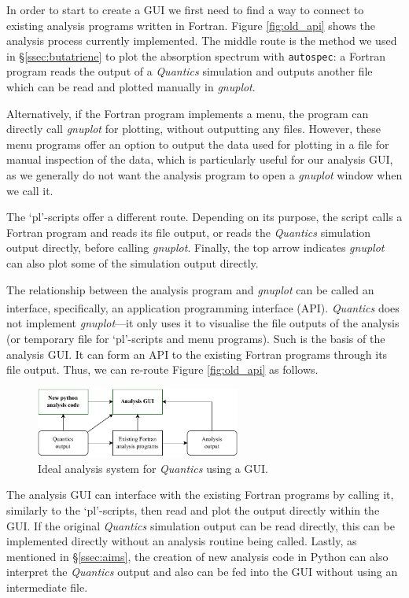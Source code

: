 \documentclass[12pt]{article}
\begin{document}
In order to start to create a GUI we first need to find a way to connect to existing analysis programs written in Fortran. Figure \ref{fig:old_api} shows the analysis process currently implemented. The middle route is the method we used in \S\ref{ssec:butatriene} to plot the absorption spectrum with \texttt{autospec}: a Fortran program reads the output of a \textit{Quantics} simulation and outputs another file which can be read and plotted manually in \textit{gnuplot}.

Alternatively, if the Fortran program implements a menu, the program can directly call \textit{gnuplot} for plotting, without outputting any files. However, these menu programs offer an option to output the data used for plotting in a file for manual inspection of the data, which is particularly useful for our analysis GUI, as we generally do not want the analysis program to open a \textit{gnuplot} window when we call it.

The `pl'-scripts offer a different route. Depending on its purpose, the script calls a Fortran program and reads its file output, or reads the \textit{Quantics} simulation output directly, before calling \textit{gnuplot}. Finally, the top arrow indicates \textit{gnuplot} can also plot some of the simulation output directly.

The relationship between the analysis program and \textit{gnuplot} can be called an interface, specifically, an application programming interface (API).\textsuperscript{\cite{api}} \textit{Quantics} does not implement \textit{gnuplot}---it only uses it to visualise the file outputs of the analysis (or temporary file for `pl'-scripts and menu programs). Such is the basis of the analysis GUI. It can form an API to the existing Fortran programs through its file output. Thus, we can re-route Figure \ref{fig:old_api} as follows.

\begin{figure}[h]
    \centering
    \includegraphics[page=1,width=0.6\textwidth]{img/new_api.pdf}
    \caption{Ideal analysis system for \textit{Quantics} using a GUI.}
    \label{fig:new_api}
\end{figure}

The analysis GUI can interface with the existing Fortran programs by calling it, similarly to the `pl'-scripts, then read and plot the output directly within the GUI. If the original \textit{Quantics} simulation output can be read directly, this can be implemented directly without an analysis routine being called. Lastly, as mentioned in \S\ref{ssec:aims}, the creation of new analysis code in Python can also interpret the \textit{Quantics} output and also can be fed into the GUI without using an intermediate file.
\end{document}
